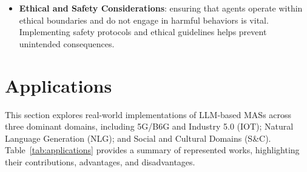 \documentclass[acmsmall,nonacm]{acmart}
\begin{document}
\begin{itemize}
            \item \textbf{Ethical and Safety Considerations}: ensuring that agents operate within ethical boundaries and do not engage in harmful behaviors is vital. Implementing safety protocols and ethical guidelines helps prevent unintended consequences.
        \end{itemize}
        
\section{Applications} \label{sec:Applications}
    This section explores real-world implementations of LLM-based MASs across three dominant domains, including 5G/B6G and Industry 5.0 (IOT); Natural Language Generation (NLG); and Social and Cultural Domains (S\&C).
    Table~\ref{tab:applications} provides a summary of represented works, highlighting their contributions, advantages, and disadvantages.
\end{document}
